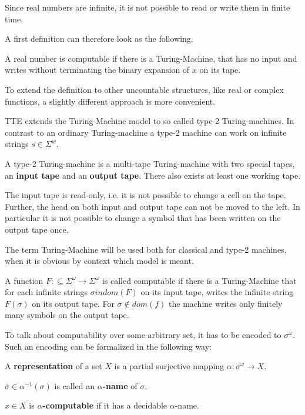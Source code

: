 Since real numbers are infinite, it is not possible to read or write them in
finite time.

A first definition can therefore look as the following.
\begin{definition}\label{def:computable real1}
 A real number is computable if there is a Turing-Machine, that has no input
 and writes without terminating the binary expansion of $x$ on its tape.
\end{definition}
To extend the definition to other uncountable structures, like real or complex
functions, a slightly different approach is more convenient.

TTE extends the Turing-Machine model to so called type-2 Turing-machines.
In contrast to an ordinary Turing-machine a type-2 machine can work on infinite strings $s \in \Sigma^w$. 
\begin{definition}
A type-2 Turing-machine is a multi-tape Turing-machine with two special tapes,
an \textbf{input tape} and an \textbf{output tape}.
There also exists at least one working tape. 

The input tape is read-only, i.e. it is not possible to change a cell on the
tape. 
Further, the head on both input and output tape can not be moved to the
left. 
In particular it is not possible to change a symbol that has been written
on the output tape once. 
\end{definition}
The term Turing-Machine will be used both for classical and type-2
machines, when it is obvious by context which model is meant.
\begin{definition}\label{def:computability_ttt}
A function $F:\subseteq \Sigma^\omega \to \Sigma^\omega$ is called computable if there is a Turing-Machine  
that for each infinite strings $\sigma in dom(F)$ on its input tape, writes the infinite string $F(\sigma)$ on its output tape. 
For $\sigma \not \in dom(f)$ the machine writes only finitely many symbols on the output tape.  
\end{definition}
To talk about computability over some arbitrary set, it has to be encoded to
$\sigma^\omega$. 
Such an encoding can be formalized in the following way:
\begin{definition}\label{def:representation}
	A \textbf{representation} of a set $X$ is a partial surjective mapping $\alpha: \sigma^\omega \to X$. 

	$\bar \sigma \in \alpha^{-1}(\sigma)$ is called an \textbf{$\alpha$-name} of $\sigma$. 

	$x \in X$ is \textbf{$\alpha$-computable} if it has a decidable $\alpha$-name.
\end{definition}

